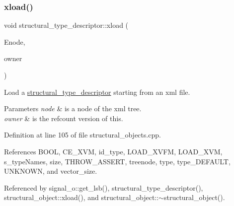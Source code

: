 \subsubsection{\texorpdfstring{xload()}{xload()}}
{\footnotesize\ttfamily void structural\+\_\+type\+\_\+descriptor\+::xload (\begin{DoxyParamCaption}\item[{const \hyperlink{classxml__element}{xml\+\_\+element} $\ast$}]{Enode,  }\item[{\hyperlink{structural__objects_8hpp_a219296792577e3292783725961506c83}{structural\+\_\+type\+\_\+descriptor\+Ref}}]{owner }\end{DoxyParamCaption})}



Load a \hyperlink{structstructural__type__descriptor}{structural\+\_\+type\+\_\+descriptor} starting from an xml file. 


\begin{DoxyParams}{Parameters}
{\em node} & is a node of the xml tree. \\
\hline
{\em owner} & is the refcount version of this. \\
\hline
\end{DoxyParams}


Definition at line 105 of file structural\+\_\+objects.\+cpp.



References B\+O\+OL, C\+E\+\_\+\+X\+VM, id\+\_\+type, L\+O\+A\+D\+\_\+\+X\+V\+FM, L\+O\+A\+D\+\_\+\+X\+VM, s\+\_\+type\+Names, size, T\+H\+R\+O\+W\+\_\+\+A\+S\+S\+E\+RT, treenode, type, type\+\_\+\+D\+E\+F\+A\+U\+LT, U\+N\+K\+N\+O\+WN, and vector\+\_\+size.



Referenced by signal\+\_\+o\+::get\+\_\+lsb(), structural\+\_\+type\+\_\+descriptor(), structural\+\_\+object\+::xload(), and structural\+\_\+object\+::$\sim$structural\+\_\+object().

